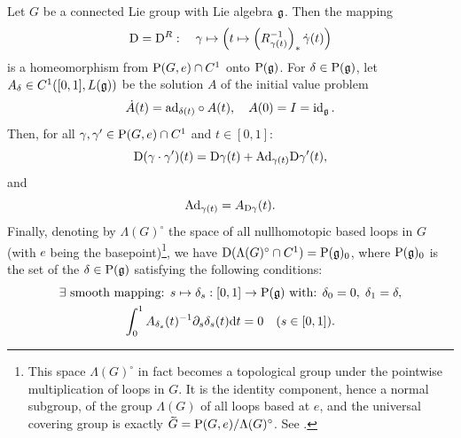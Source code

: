 \begin{lem}[{{\cite[Prop.~1.13.4]{DK}}}]\label{lem invertibility of D}
    Let $G$ be a connected Lie group with Lie algebra $\mathfrak{g}$. Then the mapping
    \[\mathrm{D}=\mathrm{D}^R:\quad \gamma\mapsto \left(t\mapsto \left(R_{\gamma(t)}^{-1}\right)_\ast\dot\gamma(t)\right)\]
    is a homeomorphism from $\mathrm{P}(G,e)\cap C^1$ onto $\mathrm{P}(\mathfrak{g})$. For $\delta\in \mathrm{P}(\mathfrak{g})$, let $A_\delta\in C^1([0,1],\boldsymbol{\mathrm{\mathrm}}{L}(\mathfrak{g}))$
    be the solution $A$ of the initial value problem
    \[\dot A(t)=\mathrm{ad}_{\delta(t)}\circ A(t),\quad A(0)=I=\operatorname{id}_{\mathfrak{g}}.\label{1792}\]
    Then, for all $\gamma,\gamma'\in \mathrm{P}(G,e)\cap C^1$ and $t\in [0,1]$:
    \[\mathrm{D}(\gamma\cdot \gamma')(t)=\mathrm{D}\gamma(t)+\mathrm{Ad}_{\gamma(t)}\mathrm{D} \gamma'(t),\label{1794}\]
    and 
    \[\mathrm{Ad}_{\gamma(t)}=A_{\mathrm{D} \gamma}(t).\]
    Finally, denoting by $\Lambda(G)^\circ$ the space of all nullhomotopic based loops in $G$ (with $e$ being the basepoint)\footnote{This space $\Lambda(G)^\circ$ in fact becomes a topological group under the pointwise multiplication of loops in $G$. It is the identity component, hence a normal subgroup, of the group $\Lambda(G)$ of all loops based at $e$, and the universal covering group is exactly $\wt{G}=\rmP(G,e)\slash\Lambda(G)^\circ$. See \cite[Prop.~1.13.2]{DK}.}, we have $\mathrm{D}(\Lambda(G)^\circ\cap C^1)=\mathrm{P}(\mathfrak{g})_0$,
    where $\mathrm{P}(\mathfrak{g})_0$ is the set of the $\delta\in\mathrm{P}(\mathfrak{g})$ satisfying the following conditions:
    \begin{gather}
        \exists \text{ smooth mapping: } s\mapsto \delta_s:[0,1]\to \mathrm{P}(\mathfrak{g})\text{ with: } \delta_0=0,\;\delta_1=\delta,\\
        \int_0^1 A_{\delta_s}(t)^{-1}\partial_s\delta_s(t){\mathrm{d}} t=0\quad (s\in [0,1]).
    \end{gather}
\end{lem}
